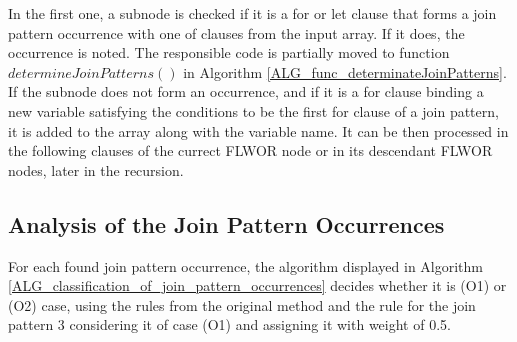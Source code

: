 In the first one, a subnode is checked if it is a for or let clause that forms a join pattern occurrence with one of clauses from the input array. If it does, the occurrence is noted. The responsible code is partially moved to function $determineJoinPatterns()$ in Algorithm \ref{ALG_func_determinateJoinPatterns}. If the subnode does not form an occurrence, and if it is a for clause binding a new variable satisfying the conditions to be the first for clause of a join pattern, it is added to the array along with the variable name. It can be then processed in the following clauses of the currect FLWOR node or in its descendant FLWOR nodes, later in the recursion.

\subsection{Analysis of the Join Pattern Occurrences}
For each found join pattern occurrence, the algorithm displayed in Algorithm \ref{ALG_classification_of_join_pattern_occurrences} decides whether it is (O1) or (O2) case, using the rules from the original method and the rule for the join pattern 3 considering it of case (O1) and assigning it with weight of 0.5.


